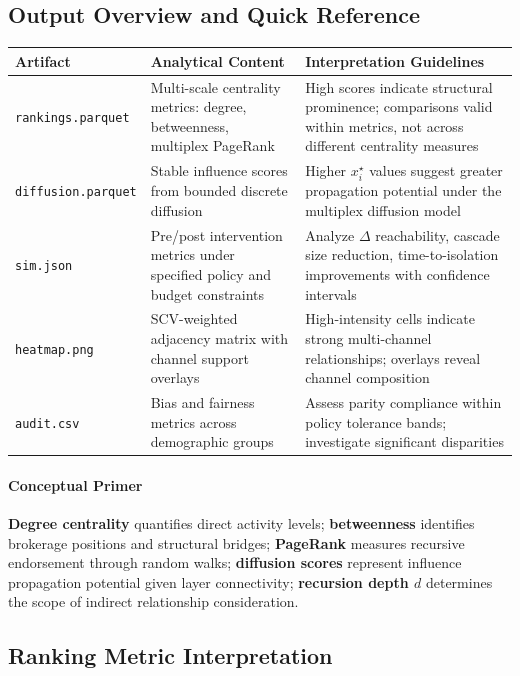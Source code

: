 \documentclass[12pt]{article}
\theoremstyle{plain}
\begin{document}
\subsection{Output Overview and Quick Reference}
\begin{center}
\small
\begin{tabular}{p{3.2cm} p{7.8cm} p{4.0cm}}
\toprule
\textbf{Artifact} & \textbf{Analytical Content} & \textbf{Interpretation Guidelines}\\
\midrule
\texttt{rankings.parquet} & Multi-scale centrality metrics: degree, betweenness, multiplex PageRank & High scores indicate structural prominence; comparisons valid within metrics, not across different centrality measures\\
\texttt{diffusion.parquet} & Stable influence scores from bounded discrete diffusion & Higher $x^\star_i$ values suggest greater propagation potential under the multiplex diffusion model\\
\texttt{sim.json} & Pre/post intervention metrics under specified policy and budget constraints & Analyze $\Delta$ reachability, cascade size reduction, time-to-isolation improvements with confidence intervals\\
\texttt{heatmap.png} & SCV-weighted adjacency matrix with channel support overlays & High-intensity cells indicate strong multi-channel relationships; overlays reveal channel composition\\
\texttt{audit.csv} & Bias and fairness metrics across demographic groups & Assess parity compliance within policy tolerance bands; investigate significant disparities\\
\bottomrule
\end{tabular}
\end{center}

\paragraph{Conceptual Primer} 
\textbf{Degree centrality} quantifies direct activity levels; \textbf{betweenness} identifies brokerage positions and structural bridges; \textbf{PageRank} measures recursive endorsement through random walks; \textbf{diffusion scores} represent influence propagation potential given layer connectivity; \textbf{recursion depth $d$} determines the scope of indirect relationship consideration.

\subsection{Ranking Metric Interpretation}
\end{document}
